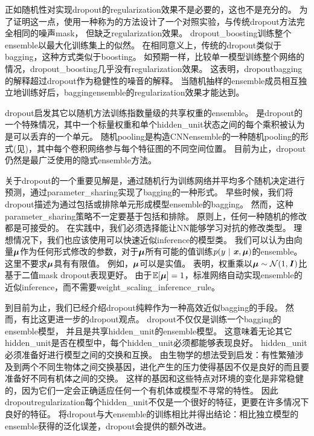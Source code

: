 正如随机性对实现\gls{dropout}的\gls{regularization}效果不是必要的，这也不是充分的。
为了证明这一点，\cite{WardeFarley+al-ICLR2014}使用一种称为的方法设计了一个对照实验，与传统\gls{dropout}方法完全相同的噪声\gls{mask}， 但缺乏\gls{regularization}效果。
\gls{dropout_boosting}训练整个\gls{ensemble}以最大化训练集上的似然。
在相同意义上，传统的\gls{dropout}类似于\gls{bagging}，这种方式类似于\gls{boosting}。
如预期一样，比较单一模型训练整个网络的情况，\gls{dropout_boosting}几乎没有\gls{regularization}效果。
这表明，\gls{dropout}\gls{bagging}的解释超过\gls{dropout}作为稳健性的噪音的解释。
当随机抽样的\gls{ensemble}成员相互独立地训练好后，\gls{bagging}\gls{ensemble}的\gls{regularization}效果才能达到。

\gls{dropout}启发其它以随机方法训练指数量级的共享权重的\gls{ensemble}。
是\gls{dropout}的一个特殊情况，其中一个标量权重和单个\gls{hidden_unit}状态之间的每个乘积被认为是可以丢弃的一个单元\citep{Wan+al-ICML2013-small}。
随机\gls{pooling}是构造\gls{CNN}\gls{ensemble}的一种随机\gls{pooling}的形式(见)，其中每个卷积网络参与每个特征图的不同空间位置。
目前为止，\gls{dropout}仍然是最广泛使用的隐式\gls{ensemble}方法。

关于\gls{dropout}的一个重要见解是，通过随机行为训练网络并平均多个随机决定进行预测，通过\gls{parameter_sharing}实现了\gls{bagging}的一种形式。
早些时候，我们将\gls{dropout}描述为通过包括或排除单元形成模型\gls{ensemble}的\gls{bagging}。
然而，这种\gls{parameter_sharing}策略不一定要基于包括和排除。
原则上，任何一种随机的修改都是可接受的。
在实践中，我们必须选择能让\gls{NN}能够学习对抗的修改类型。
理想情况下，我们也应该使用可以快速近似\gls{inference}的模型类。
我们可以认为由向量$\boldsymbol{\mu}$作为任何形式修改的参数，对于$\boldsymbol{\mu}$所有可能的值训练$p(y ~|~ \boldsymbol{\mathit{x}}, \boldsymbol{\mu})$的\gls{ensemble}。
这里不要求$\boldsymbol{\mu}$具有有限值。
例如，$\boldsymbol{\mu}$可以是实值。
\cite{Srivastava14}表明，权重乘以$\boldsymbol{\mu} \sim \mathcal{N}(1, \boldsymbol{\mathit{I}})$比基于二值\gls{mask} \gls{dropout}表现更好。
由于$\mathbb{E}[\boldsymbol{\mu}] = 1$，标准网络自动实现\gls{ensemble}的近似\gls{inference}，而不需要\gls{weight_scaling_inference_rule}。


到目前为止，我们已经介绍\gls{dropout}纯粹作为一种高效近似\gls{bagging}的手段。
然而，有比这更进一步的\gls{dropout}观点。
\gls{dropout}不仅仅是训练一个\gls{bagging}的\gls{ensemble}模型，
并且是共享\gls{hidden_unit}的\gls{ensemble}模型。
这意味着无论其它\gls{hidden_unit}是否在模型中，每个\gls{hidden_unit}必须都能够表现良好。
\gls{hidden_unit}必须准备好进行模型之间的交换和互换。
\cite{Hinton-et-al-arxiv2012-small}由生物学的想法受到启发：有性繁殖涉及到两个不同生物体之间交换基因，进化产生的压力使得基因不仅是良好的而且要准备好不同有机体之间的交换。
这样的基因和这些特点对环境的变化是非常稳健的，因为它们一定会正确适应任何一个有机体或模型不寻常的特性。
因此\gls{dropout}\gls{regularization}每个\gls{hidden_unit}不仅是一个很好的特征，更要在许多情况下良好的特征。
\cite{WardeFarley+al-ICLR2014}将\gls{dropout}与大\gls{ensemble}的训练相比并得出结论：相比独立模型的\gls{ensemble}获得的泛化误差，\gls{dropout}会提供的额外改进。

